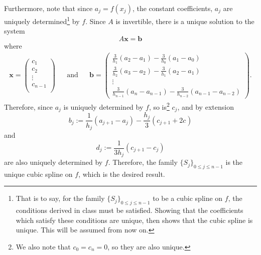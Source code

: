 \documentclass[12pt]{article}
\begin{document}
\begin{enumerate}[leftmargin=2em]
\begin{enumerate}
        Furthermore, note that since $a_j=f(x_{j})$, the constant coefficients, $a_j$ are uniquely determined\footnote{That is to say, for the family $\{S_j\}_{0\leq j \leq n-1}$ to be a cubic spline on $f$, the conditions derived in class must be satisfied. Showing that the coefficients which satisfy these conditions are unique, then shows that the cubic spline is unique. This will be assumed from now on.} by $f$. Since $A$ is invertible, there is a unique solution to the system
        \[A\mathbf{x}=\mathbf{b}\]
        where
        \begin{align*}
            \mathbf{x} = \begin{pmatrix}
                c_1 \\ 
                c_2 \\ 
                \vdots \\
                c_{n-1}\\
            \end{pmatrix} & & \text{and} && \mathbf{b}=
            \begin{pmatrix}
                \frac{3}{h_{1}}(a_{2}-a_{1}) - \frac{3}{h_{0}}(a_{1}-a_{0})\\
                \frac{3}{h_{2}}(a_{3}-a_{2}) - \frac{3}{h_{1}}(a_{2}-a_{1})\\ 
                \vdots\\
                \frac{3}{h_{n-1}}(a_{n}-a_{n-1})- \frac{3}{h_{n-2}}(a_{n-1}-a_{n-2})
            \end{pmatrix}.
        \end{align*}
        Therefore, since $a_j$ is uniquely determined by $f$, so is\footnote{We also note that $c_0=c_n=0$, so they are also unique.} $c_j$, and by extension 
        \[b_j:= \frac{1}{h_{j}}(a_{j+1}-a_{j})-\frac{h_{j}}{3}(c_{j+1}+2c_{})\]
        and 
        \[d_j:=\frac{1}{3h_{j}}(c_{j+1}-c_{j})\]
        are also uniquely determined by $f$. Therefore, the family $\{S_{j}\}_{0\leq j\leq n-1}$ is the unique cubic spline on $f$, which is the desired result.
    \end{enumerate}
\end{enumerate}
\end{document}
